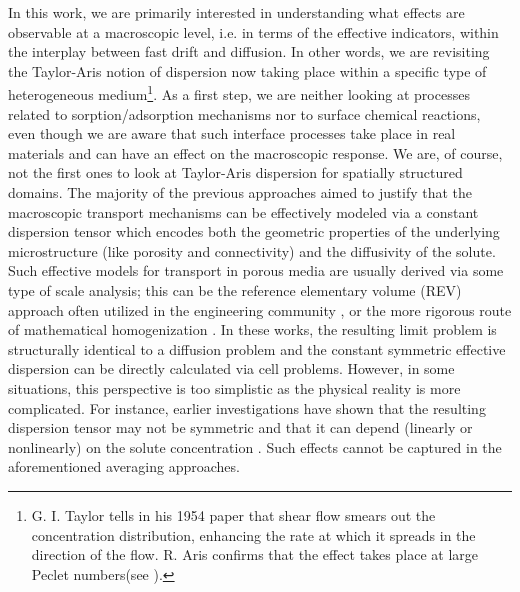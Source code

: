 \documentclass[11pt]{article}
\begin{document}
In this work, we are primarily interested in understanding what effects are observable at a macroscopic level, i.e. in terms of the effective indicators, within the interplay between fast drift and diffusion.
In other words, we are revisiting the Taylor-Aris notion of dispersion now taking place within a specific type of heterogeneous medium\footnote{G. I. Taylor tells in his 1954 paper \cite{taylor1954conditions} that shear flow smears out the concentration distribution, enhancing the rate at which it spreads in the direction of the flow. R. Aris confirms that the effect takes place at large Peclet numbers(see \cite{aris1956dispersion}).}.
As a first step, we are neither looking at processes related to sorption/adsorption mechanisms nor to surface chemical reactions, even though we are aware that such interface processes take place in real materials and can have an effect on the macroscopic response.  
We are, of course, not the first ones to look at Taylor-Aris dispersion for spatially structured domains.
The majority of the previous approaches aimed to justify that the macroscopic transport mechanisms can be effectively modeled via a constant dispersion tensor which encodes both the geometric properties of the underlying microstructure (like porosity and connectivity) and the diffusivity of the solute. 
Such effective models for transport in porous media are usually derived via some type of scale analysis; this can be the reference elementary volume (REV) approach often utilized in the engineering community \cite{bear1988dynamics, bear2012phenomenological,Wood2003RVE}, or the more rigorous route of mathematical homogenization \cite{ALLAIRE20102292,Allaire_dispersion,Amaziane}. 
In these works, the resulting limit problem is structurally identical to a diffusion problem and the constant symmetric effective dispersion can be directly calculated via cell problems.
However, in some situations, this perspective is too simplistic as the physical reality is more complicated.
For instance, earlier investigations have shown that the resulting dispersion tensor may not be symmetric \cite{Auriault2010} and that it can depend  (linearly or nonlinearly) on the solute concentration \cite{Schotting1999}. 
Such effects cannot be captured in the aforementioned averaging approaches. 
\end{document}
